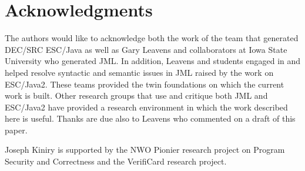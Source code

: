 \documentclass{llncs}
\begin{document}
\section{Acknowledgments}
The authors would like to acknowledge both the work of the team that
generated DEC/SRC ESC/Java as well as Gary Leavens and collaborators
at Iowa State University who generated JML.  In addition, Leavens and
students engaged in and helped resolve syntactic and semantic issues
in JML raised by the work on ESC/Java2.  These teams provided the twin
foundations on which the current work is built.  Other research groups
that use and critique both JML and ESC/Java2 have provided a research
environment in which the work described here is useful.  Thanks are
due also to Leavens who commented on a draft of this paper.

Joseph Kiniry is supported by the NWO Pionier research project on
Program Security and Correctness and the VerifiCard research project.

\newpage

%

%  
\end{document}
